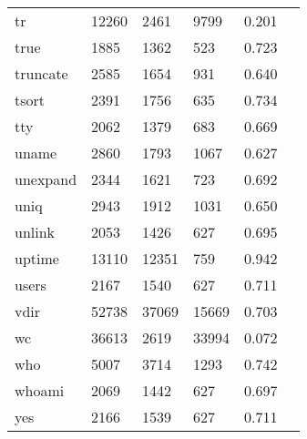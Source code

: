 \begin{longtable}{lp{2.40cm}p{2.40cm}p{2.40cm}p{2.40cm}p{2.40cm}}
tr        &                    12260 &         2461 &          9799 &                    0.201 \\
true      &                     1885 &         1362 &           523 &                    0.723 \\
truncate  &                     2585 &         1654 &           931 &                    0.640 \\
tsort     &                     2391 &         1756 &           635 &                    0.734 \\
tty       &                     2062 &         1379 &           683 &                    0.669 \\
uname     &                     2860 &         1793 &          1067 &                    0.627 \\
unexpand  &                     2344 &         1621 &           723 &                    0.692 \\
uniq      &                     2943 &         1912 &          1031 &                    0.650 \\
unlink    &                     2053 &         1426 &           627 &                    0.695 \\
uptime    &                    13110 &        12351 &           759 &                    0.942 \\
users     &                     2167 &         1540 &           627 &                    0.711 \\
vdir      &                    52738 &        37069 &         15669 &                    0.703 \\
wc        &                    36613 &         2619 &         33994 &                    0.072 \\
who       &                     5007 &         3714 &          1293 &                    0.742 \\
whoami    &                     2069 &         1442 &           627 &                    0.697 \\
yes       &                     2166 &         1539 &           627 &                    0.711 \\
\end{longtable}
